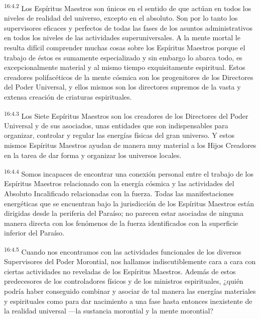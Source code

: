 \par
\textsuperscript{16:4.2} Los Espíritus Maestros son únicos en el sentido de que actúan en todos los niveles de realidad del universo, excepto en el absoluto. Son por lo tanto los supervisores eficaces y perfectos de todas las fases de los asuntos administrativos en todos los niveles de las actividades superuniversales. A la mente mortal le resulta difícil comprender muchas cosas sobre los Espíritus Maestros porque el trabajo de éstos es sumamente especializado y sin embargo lo abarca todo, es excepcionalmente material y al mismo tiempo exquisitamente espiritual. Estos creadores polifacéticos de la mente cósmica son los progenitores de los Directores del Poder Universal, y ellos mismos son los directores supremos de la vasta y extensa creación de criaturas espirituales.

\par
\textsuperscript{16:4.3} Los Siete Espíritus Maestros son los creadores de los Directores del Poder Universal y de sus asociados, unas entidades que son indispensables para organizar, controlar y regular las energías físicas del gran universo. Y estos mismos Espíritus Maestros ayudan de manera muy material a los Hijos Creadores en la tarea de dar forma y organizar los universos locales.

\par
\textsuperscript{16:4.4} Somos incapaces de encontrar una conexión personal entre el trabajo de los Espíritus Maestros relacionado con la energía cósmica y las actividades del Absoluto Incalificado relacionadas con la fuerza. Todas las manifestaciones energéticas que se encuentran bajo la jurisdicción de los Espíritus Maestros están dirigidas desde la periferia del Paraíso; no parecen estar asociadas de ninguna manera directa con los fenómenos de la fuerza identificados con la superficie inferior del Paraíso.

\par
\textsuperscript{16:4.5} Cuando nos encontramos con las actividades funcionales de los diversos Supervisores del Poder Morontial, nos hallamos indiscutiblemente cara a cara con ciertas actividades no reveladas de los Espíritus Maestros. Además de estos predecesores de los controladores físicos y de los ministros espirituales, ¿quién podría haber conseguido combinar y asociar de tal manera las energías materiales y espirituales como para dar nacimiento a una fase hasta entonces inexistente de la realidad universal ---la sustancia morontial y la mente morontial?

